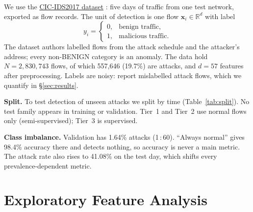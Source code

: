 \documentclass[11pt]{article}
\begin{document}
We use the \href{https://www.unb.ca/cic/datasets/ids-2017.html}{CIC-IDS2017 dataset} \citep{sharafaldin2018}: five days of traffic from one test network, exported as flow records. The unit of detection is one flow $\mathbf{x}_i \in \mathbb{R}^{d}$ with label
\begin{equation}
y_i =
\begin{cases}
0, & \text{benign traffic},\\
1, & \text{malicious traffic}.
\end{cases}
\end{equation}
The dataset authors labelled flows from the attack schedule and the attacker's address; every non-BENIGN category is an anomaly. The data hold $N=2{,}830{,}743$ flows, of which 557,646 (19.7\%) are attacks, and $d=57$ features after preprocessing. Labels are noisy: \citet{engelen2021} report mislabelled attack flows, which we quantify in \S\ref{sec:results}.

\begin{table}[t]
\centering
\small
\setlength{\tabcolsep}{3pt}
\caption{Chronological split shared by all tiers. Validation also holds 5 slowloris flows.}
\label{tab:split}
\end{table}

\textbf{Split.} To test detection of unseen attacks we split by time (Table~\ref{tab:split}). No test family appears in training or validation. Tier~1 and Tier~2 use normal flows only (semi-supervised); Tier~3 is supervised.

\textbf{Class imbalance.} Validation has 1.64\% attacks (1\,:\,60). ``Always normal'' gives 98.4\% accuracy there and detects nothing, so accuracy is never a main metric. The attack rate also rises to 41.08\% on the test day, which shifts every prevalence-dependent metric.

\section{Exploratory Feature Analysis}
\label{sec:eda}
\end{document}
